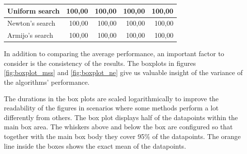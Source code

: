 \documentclass[a4paper,english,titlepage,12pt]{article}
\begin{document}
\begin{table}[H]
\begin{tabular}{|l|r|r|r|r|}
    Uniform search                                                             & 100,00                                                   & 100,00                                                    & 100,00                                                    & 100,00                                                    \\ \hline
    Newton's search                                                             & 100,00                                                   & 100,00                                                    & 100,00                                                    & 100,00                                                    \\ \hline
    Armijo's search                                                              & 100,00                                                   & 100,00                                                    & 100,00                                                    & 100,00                                                    \\ \hline
    \end{tabular}
\end{table}


In addition to comparing the average performance, an important factor to consider is the consistency of the results. The boxplots in figures \ref{fig:boxplot_mss} and \ref{fig:boxplot_ne} give us valuable insight of the variance of the algorithms' performance.

The durations in the box plots are scaled logarithmically to improve the readability of the figures in scenarios where some methods perform a lot differently from others. The box plot displays half of the datapoints within the main box area. The whiskers above and below the box are configured so that together with the main box body they cover 95\% of the datapoints. The orange line inside the boxes shows the exact mean of the datapoints.
\end{document}
